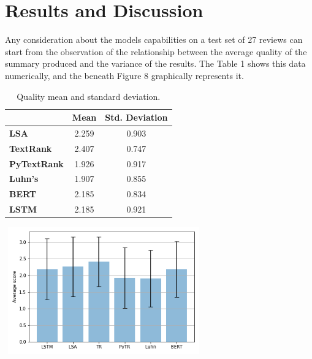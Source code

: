 \documentclass[fleqn,10pt]{SelfArx} %
\begin{document}
\section{Results and Discussion}
Any consideration about the models capabilities on a test set of 27 reviews can start from the observation of the relationship between the average quality of the summary produced and the variance of the results. The Table 1 shows this data numerically, and the beneath Figure 8 graphically represents it.\par
{\begin{table}[ht]
\centering
\begin{tabular}[t]{lcc}
\toprule
&Mean&Std. Deviation\\
\midrule
\textbf{LSA}&2.259&0.903\\
\textbf{TextRank}&2.407&0.747\\
\textbf{PyTextRank}&1.926&0.917\\
\textbf{Luhn's}&1.907&0.855\\
\textbf{BERT}&2.185&0.834\\
\textbf{LSTM}&2.185&0.921\\
\bottomrule
\end{tabular}
\caption{Quality mean and standard deviation.}
\end{table}\par}
\par
{\centering\vspace{10pt}
\includegraphics[width=8.5cm, height=5.5cm]{results.png}
\vspace{10pt}
\par}
\end{document}
